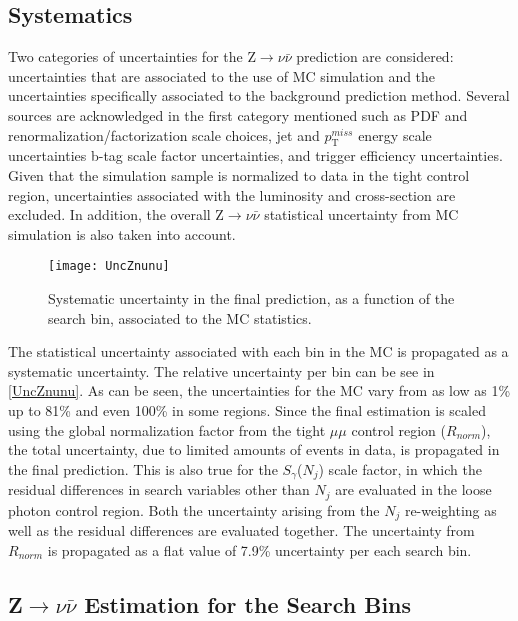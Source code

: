 \subsection{Systematics}\label{systematics}

Two categories of uncertainties for the Z$\rightarrow\nu\bar{\nu}$ prediction are considered: uncertainties that are associated to the use of MC simulation and the uncertainties specifically associated to the background prediction method. Several sources are acknowledged in the first category mentioned such as PDF and renormalization/factorization scale choices, jet and $p_\text{T}^{miss}$ energy scale uncertainties b-tag scale factor uncertainties, and trigger efficiency uncertainties. Given that the simulation sample is normalized to data in the tight control region, uncertainties associated with the luminosity and cross-section are excluded. In addition, the overall Z$\rightarrow\nu\bar{\nu}$ statistical uncertainty from MC simulation is also taken into account.\\

\begin{figure}[H]
\begin{center}
\texttt{[image: UncZnunu]}
\end{center}
\vspace{-1em}
\caption{Systematic uncertainty in the final prediction, as a function of the search bin, associated to the MC statistics.}
\label{UncZnunu}
\end{figure}

The statistical uncertainty associated with each bin in the MC is propagated as a systematic uncertainty. The relative uncertainty per bin can be see in \autoref{UncZnunu}. As can be seen, the uncertainties for the MC vary from as low as 1\% up to 81\% and even 100\% in some regions. Since the final estimation is scaled using the global normalization factor from the tight $\mu\mu$ control region ($R_{norm}$), the total uncertainty, due to limited amounts of events in data, is propagated in the final prediction. This is also true for the $S_\gamma$($N_j$) scale factor, in which the residual differences in search variables other than $N_j$ are evaluated in the loose photon control region. Both the uncertainty arising from the $N_j$ re-weighting as well as the residual differences are evaluated together. The uncertainty from $R_{norm}$ is propagated as a flat value of 7.9\% uncertainty per each search bin.

\subsection{Z$\rightarrow\nu\bar{\nu}$ Estimation for the Search Bins}

